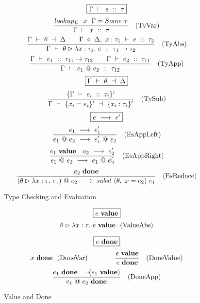 \begin{figure}[ht!]
\vspace{1ex}
$$
\fbox{$\Gamma ~\vdash~ e ~::~ \tau$}
$$
$$
\frac {\displaystyle        lookup_E ~~x~~ \Gamma = Some~ \tau
} {\displaystyle        \Gamma ~\vdash~ x ~::~ \tau
} \ 
~~
\textrm{(TyVar)}
$$
$$
\ruleI
{       \TypeS  {\Gamma}{\theta}{\Delta}
\quad\quad   
        \TypeX  {\Gamma ~\circ~ \Delta,~ x : \tau_1}
                {e}{\tau_2}
}
{       \TypeX  {\Gamma}
                {\theta \rhd \lambda x : \tau_1.~ e}
                {\tau_1 \to \tau_2}
}
~~
\textrm{(TyAbs)}
$$
$$
\frac {\displaystyle        \Gamma ~\vdash~ e_1 ~::~ \tau_{11} \to \tau_{12}
\quad\quad
        \Gamma ~\vdash~ e_2 ~::~ \tau_{11}
} {\displaystyle        \Gamma ~\vdash~ e_1 ~@~ e_2 ~::~ \tau_{12}
} \ 
~~
\textrm{(TyApp)}
$$
\vspace{1em}
$$\fbox{$\TypeS{\Gamma}{\theta}{\Delta}$}$$
$$
\ruleI
{       \{ \TypeX{\Gamma}{e_i}{\tau_i} \}^i
}
{       \TypeS  {\Gamma}
                { \{ x_i = e_i \}^i }
                { \{ x_i : \tau_i \}^i }
}
~~
\textrm{(TySub)}
$$
\vspace{2em}
$$
\fbox{$e ~\longrightarrow~ e'$}
$$
$$
\frac {\displaystyle        e_1 ~\longrightarrow~ e_1'
} {\displaystyle        e_1 ~@~ e_2 ~\longrightarrow~ e_1' ~@~ e_2
} \ 
~~ \textrm{(EsAppLeft)}
$$
$$
\frac {\displaystyle        e_1~ \textbf{value}
\quad   e_2 ~\longrightarrow~ e_2'
} {\displaystyle        e_1 ~@~ e_2 ~\longrightarrow~ e_1 ~@~ e_2'
} \ 
~~ \textrm{(EsAppRight)}
$$
$$
\frac {\displaystyle        e_2~ \textbf{done}
} {\displaystyle        (\theta \rhd \lambda x : \tau.~ e_1) ~@~ e_2 ~\longrightarrow~ \mathit{subst}~ (\theta,~ x = e_2)~ e_1
} \ 
~~ \textrm{(EsReduce)}
$$

\caption{Type Checking and Evaluation}
\label{f:TypeChecking}
\end{figure}



\begin{figure}[ht!]
$$
\fbox{$e~ \textbf{value}$}
$$
$$ \theta \rhd \lambda x : \tau.~ e~ \textbf{value}
~~ \textrm{(ValueAbs)}
$$

$$
\fbox{$e~ \textbf{done}$}
$$
$$ x~ \textbf{done}
~~ \textrm{(DoneVar)}
\hspace{4em}
\frac {\displaystyle        e~ \textbf{value}} {\displaystyle        e~ \textbf{done}} \ 
~~ \textrm{(DoneValue)}
$$
$$
\frac {\displaystyle        e_1~ \textbf{done} 
\quad   \neg (e_1~ \textbf{value})
} {\displaystyle        e_1 ~@~ e_2~ \textbf{done}
} \ 
~~ \textrm{(DoneApp)}
$$

\caption{Value and Done}
\label{f:ValueDone}
\end{figure}


